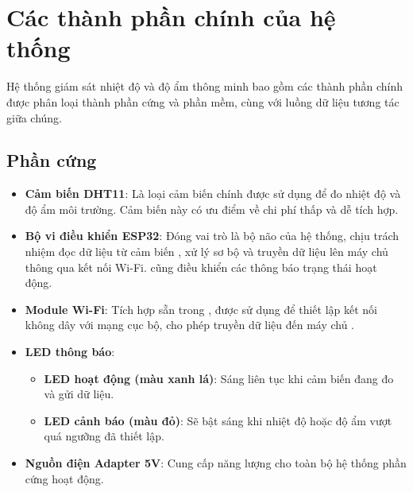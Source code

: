 \section{Các thành phần chính của hệ thống}
Hệ thống giám sát nhiệt độ và độ ẩm thông minh bao gồm các thành phần chính được phân loại thành phần cứng và phần mềm, cùng với luồng dữ liệu tương tác giữa chúng.

\subsection{Phần cứng}
\begin{itemize}
	\item \textbf{Cảm biến DHT11}: Là loại cảm biến chính được sử dụng để đo nhiệt độ và độ ẩm môi trường. Cảm biến này có ưu điểm về chi phí thấp và dễ tích hợp.
	\item \textbf{Bộ vi điều khiển ESP32}: Đóng vai trò là bộ não của hệ thống,  chịu trách nhiệm đọc dữ liệu từ cảm biến , xử lý sơ bộ và truyền dữ liệu lên máy chủ thông qua kết nối Wi-Fi.  cũng điều khiển các  thông báo trạng thái hoạt động.
	\item \textbf{Module Wi-Fi}: Tích hợp sẵn trong , được sử dụng để thiết lập kết nối không dây với mạng cục bộ, cho phép truyền dữ liệu đến máy chủ .
	\item \textbf{LED thông báo}:
	\begin{itemize}
		\item \textbf{LED hoạt động (màu xanh lá)}: Sáng liên tục khi cảm biến đang đo và gửi dữ liệu.
		\item \textbf{LED cảnh báo (màu đỏ)}: Sẽ bật sáng khi nhiệt độ hoặc độ ẩm vượt quá ngưỡng đã thiết lập.
	\end{itemize}
	\item \textbf{Nguồn điện Adapter 5V}: Cung cấp năng lượng cho toàn bộ hệ thống phần cứng hoạt động.
\end{itemize}

